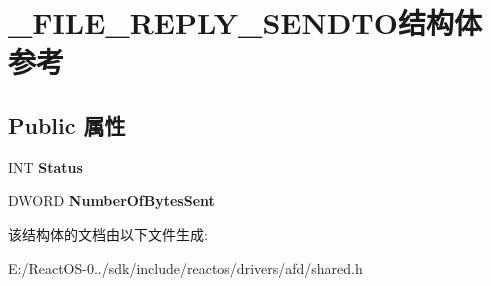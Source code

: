 \hypertarget{struct___f_i_l_e___r_e_p_l_y___s_e_n_d_t_o}{}\section{\+\_\+\+F\+I\+L\+E\+\_\+\+R\+E\+P\+L\+Y\+\_\+\+S\+E\+N\+D\+T\+O结构体 参考}
\label{struct___f_i_l_e___r_e_p_l_y___s_e_n_d_t_o}
\subsection*{Public 属性}
\begin{DoxyCompactItemize}
\item 
\mbox{\label{struct___f_i_l_e___r_e_p_l_y___s_e_n_d_t_o_ac9e010ee661c412d7b23810a11236053}} 
I\+NT {\bfseries Status}
\item 
\mbox{\label{struct___f_i_l_e___r_e_p_l_y___s_e_n_d_t_o_a61dc7e8bef097e6a00016afa76f8cbf2}} 
D\+W\+O\+RD {\bfseries Number\+Of\+Bytes\+Sent}
\end{DoxyCompactItemize}


该结构体的文档由以下文件生成\+:\begin{DoxyCompactItemize}
\item 
E\+:/\+React\+O\+S-\/0../sdk/include/reactos/drivers/afd/shared.\+h\end{DoxyCompactItemize}
